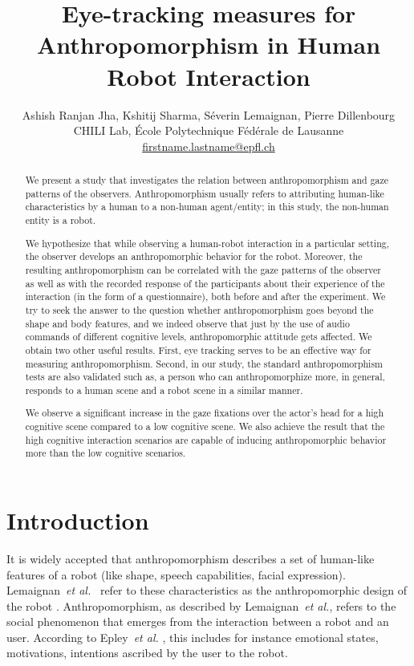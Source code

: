 \documentclass[a4,twocolumn,10pt]{article}
\title{Eye-tracking measures for Anthropomorphism in Human Robot Interaction}
\author{
Ashish Ranjan Jha, Kshitij Sharma, Séverin Lemaignan, Pierre Dillenbourg\\
CHILI Lab, École Polytechnique Fédérale de Lausanne\\
\url{firstname.lastname@epfl.ch}
}
\newcommand{\etal}{{\textit{et al.\xspace}}}
\begin{document}
\maketitle
\begin{abstract}


We present a study that investigates the relation between anthropomorphism and
gaze patterns of the observers. Anthropomorphism usually refers to attributing
human-like characteristics by a human to a non-human agent/entity; in this
study, the non-human entity is a robot. 

We hypothesize that while observing a human-robot interaction in a particular
setting, the observer develops an anthropomorphic behavior for the robot.
Moreover, the resulting anthropomorphism can be correlated with the gaze
patterns of the observer as well as with the recorded response of the
participants about their experience of the interaction (in the form of a
questionnaire), both before and after the experiment. We try to seek the answer
to the question whether anthropomorphism goes beyond the shape and body
features, and we indeed observe that just by the use of audio commands of
different cognitive levels, anthropomorphic attitude gets affected. We obtain
two other useful results. First, eye tracking serves to be an effective way for
measuring anthropomorphism. Second, in our study, the standard anthropomorphism
tests are also validated such as, a person who can anthropomorphize more, in
general, responds to a human scene and a robot scene in a similar manner.

We observe a significant increase in the gaze fixations over the actor's head
for a high cognitive scene compared to a low cognitive scene. We also achieve
the result that the high cognitive interaction scenarios are capable of inducing
anthropomorphic behavior more than the low cognitive scenarios.

\end{abstract}


\section{Introduction}

It is widely accepted that anthropomorphism describes a set of human-like
features of a robot (like shape, speech capabilities, facial expression).
Lemaignan~\etal~\cite{lemaignan2014dynamics}  refer to these characteristics as the
anthropomorphic design of the robot .  Anthropomorphism, as described by
Lemaignan~\etal, refers to the social phenomenon that emerges from the
interaction between a robot and an user. According to Epley~\etal
\cite{epley_when_2008},
this includes for instance emotional states, motivations, intentions ascribed by
the user to the robot. 
\end{document}
